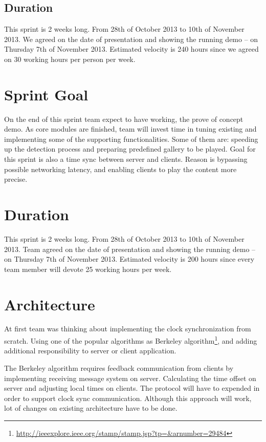 

\subsection{Duration}
This sprint is 2 weeks long. From 28th of October 2013 to 10th of November 2013. We agreed
on the date of presentation and showing the running demo – on Thursday 7th of November 2013.
Estimated velocity is 240 hours since we agreed on 30 working hours per person per week. 


\section{Sprint Goal}

On the end of this sprint team expect to have working, the prove of concept demo. As core modules are finished, team will invest time in tuning existing and implementing some of the supporting functionalities. Some of them are: speeding up the detection process  and preparing predefined gallery to be played. Goal for this sprint is also a time sync between server and clients. Reason is bypassing possible networking latency, and enabling clients to play the content more precise. 

\section{Duration}
This sprint is 2 weeks long. From 28th of October 2013 to 10th of November 2013. 
Team agreed on the date of presentation and showing the running demo – on Thursday 7th of November 2013.
Estimated velocity is 200 hours since every team member will devote 25 working hours per week.

\section{Architecture}

At first team was thinking about implementing the clock synchronization from scratch. Using one of the popular algorithms as Berkeley algorithm\footnote{\url{http://ieeexplore.ieee.org/stamp/stamp.jsp?tp=\&arnumber=29484}}, and adding additional responsibility to server or client application. 

The Berkeley algorithm requires feedback communication from clients by implementing receiving message system on server. Calculating the time offset on server and adjusting local times on clients. The protocol will have to expended in order to support clock sync communication. Although this approach will work, lot of changes on existing architecture have to be done.

